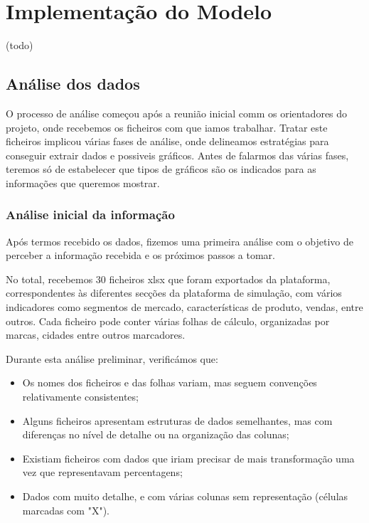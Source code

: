 

\chapter{Implementação do Modelo}
\label{ch:implementacaoDoModelo}

(todo)

\section{Análise dos dados}
O processo de análise começou após a reunião inicial comm os orientadores do projeto, onde recebemos os ficheiros com que iamos trabalhar. Tratar este ficheiros implicou várias fases de análise, onde delineamos estratégias para conseguir extrair dados e possiveis gráficos. Antes de falarmos das várias fases, teremos só de estabelecer que tipos de gráficos são os indicados para as informações que queremos mostrar.

\subsection{Análise inicial da informação}
Após termos recebido os dados, fizemos uma primeira análise com o objetivo de perceber a informação recebida e os próximos passos a tomar.

No total, recebemos 30 ficheiros \gls{xlsx} que foram exportados da plataforma, correspondentes às diferentes secções da plataforma de simulação, com vários indicadores como segmentos de mercado, características de produto, vendas, entre outros. Cada ficheiro pode conter várias folhas de cálculo, organizadas por marcas, cidades entre outros marcadores.

Durante esta análise preliminar, verificámos que:
\begin{itemize}
    \item Os nomes dos ficheiros e das folhas variam, mas seguem convenções relativamente consistentes;
    \item Alguns ficheiros apresentam estruturas de dados semelhantes, mas com diferenças no nível de detalhe ou na organização das colunas;
    \item Existiam ficheiros com dados que iriam precisar de mais transformação uma vez que representavam percentagens;
    \item Dados com muito detalhe, e com várias colunas sem representação (células marcadas com "X").
\end{itemize}

